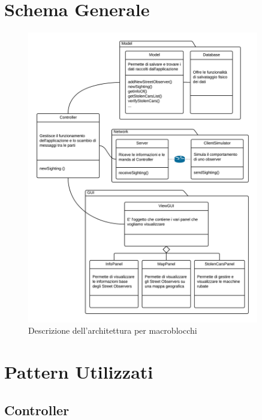 \documentclass[a4paper,12pt]{report}
\begin{document}
\section {Schema Generale}
\begin{figure}[H]
  \centering
\includegraphics[width=0.90\textwidth]{images/smartCitiesTresSimpleDiagram}
  \caption{Descrizione dell'architettura per macroblocchi}
  \label{fig:smartCitiesTresSimpleDiagram}
\end{figure}
\clearpage
\section{Pattern Utilizzati}

  \subsection{Controller}
\end{document}
